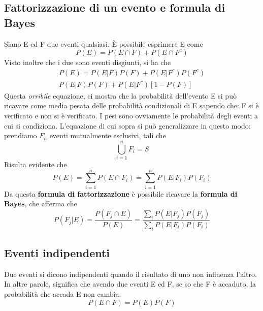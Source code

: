 \documentclass[11pt]{article}
\begin{document}
\subsection{Fattorizzazione di un evento e formula di Bayes}
Siano E ed F due eventi qualsiasi. È possibile esprimere E come
\begin{displaymath}
    P(E) = P(E\cap F) + P(E\cap F^c)
\end{displaymath}
Visto inoltre che i due sono eventi disgiunti, si ha che
\begin{gather*}
    P(E) = P(E|F)P(F) + P(E|F^c)P(F^c)\\
    P(E|F)P(F) + P(E|F^c)[1-P(F)]
\end{gather*}
Questa \textit{orribile} equazione, ci mostra che la probabilità dell'evento E si può ricavare come media pesata delle probabilità condizionali di E sapendo che: F si è verificato e non si è verificato. I pesi sono ovviamente le probabilità degli eventi a cui si condiziona.
L'equazione di cui sopra si può generalizzare in questo modo: prendiamo $F_n$ eventi mutualmente esclusivi, tali che 
\begin{displaymath}
    \bigcup_{i=1}^nF_i=S
\end{displaymath}
Risulta evidente che
\begin{displaymath}
    P(E)=\sum_{i=1}^n P(E\cap F_i)=\sum_{i=1}^n P(E|F_i)P(F_i)
\end{displaymath}
Da questa \textbf{formula di fattorizzazione} è possibile ricavare la \textbf{formula di Bayes}, che afferma che
\begin{displaymath}
    P(F_j|E)=\frac{P(F_j \cap E)}{P(E)}=\frac{\sum_i P(E|F_j)P(F_j)}{\sum_i P(E|F_i)P(F_i)}
\end{displaymath}
\subsection{Eventi indipendenti}
Due eventi si dicono indipendenti quando il risultato di uno non influenza l'altro. In altre parole, significa che avendo due eventi E ed F, se so che F è accaduto, la probabilità che accada E non cambia.
\begin{displaymath}
    P(E\cap F) = P(E) P(F)
\end{displaymath}
\end{document}
